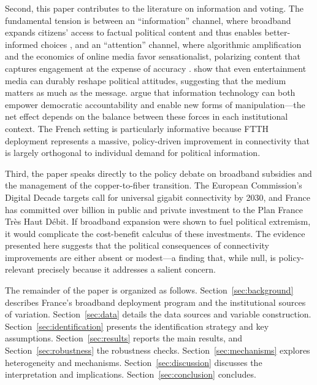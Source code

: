 \documentclass[12pt]{article}
\begin{document}
Second, this paper contributes to the literature on information and voting. The fundamental tension is between an ``information'' channel, where broadband expands citizens' access to factual political content and thus enables better-informed choices \citep{gentzkow2011ideological}, and an ``attention'' channel, where algorithmic amplification and the economics of online media favor sensationalist, polarizing content that captures engagement at the expense of accuracy \citep{allcott2017social}. \citet{durante2019political} show that even entertainment media can durably reshape political attitudes, suggesting that the medium matters as much as the message. \citet{guriev2021informational} argue that information technology can both empower democratic accountability and enable new forms of manipulation---the net effect depends on the balance between these forces in each institutional context. The French setting is particularly informative because FTTH deployment represents a massive, policy-driven improvement in connectivity that is largely orthogonal to individual demand for political information.

Third, the paper speaks directly to the policy debate on broadband subsidies and the management of the copper-to-fiber transition. The European Commission's Digital Decade targets call for universal gigabit connectivity by 2030, and France has committed over  billion in public and private investment to the Plan France Tr\`es Haut D\'ebit. If broadband expansion were shown to fuel political extremism, it would complicate the cost-benefit calculus of these investments. The evidence presented here suggests that the political consequences of connectivity improvements are either absent or modest---a finding that, while null, is policy-relevant precisely because it addresses a salient concern.

The remainder of the paper is organized as follows. Section~\ref{sec:background} describes France's broadband deployment program and the institutional sources of variation. Section~\ref{sec:data} details the data sources and variable construction. Section~\ref{sec:identification} presents the identification strategy and key assumptions. Section~\ref{sec:results} reports the main results, and Section~\ref{sec:robustness} the robustness checks. Section~\ref{sec:mechanisms} explores heterogeneity and mechanisms. Section~\ref{sec:discussion} discusses the interpretation and implications. Section~\ref{sec:conclusion} concludes.


\end{document}

